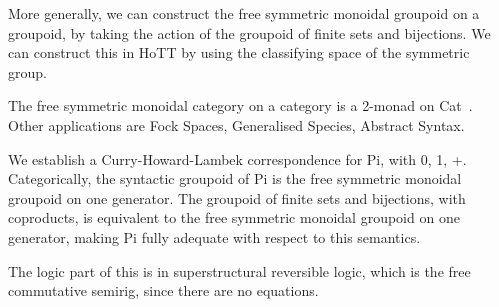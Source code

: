More generally, we can construct the free symmetric monoidal groupoid on a groupoid, by taking the action of the
groupoid of finite sets and bijections. We can construct this in HoTT by using the classifying space of the symmetric
group.

The free symmetric monoidal category on a category is a 2-monad on
Cat~\cite{blackwellTwodimensionalMonadTheory1989,abramskyAbstractScalarsLoops2005,leinsterHigherOperadsHigher2004}.
Other applications are Fock Spaces, Generalised Species, Abstract Syntax.

We establish a Curry-Howard-Lambek correspondence for Pi, with 0, 1, +. Categorically, the syntactic groupoid of Pi is
the free symmetric monoidal groupoid on one generator. The groupoid of finite sets and bijections, with coproducts, is
equivalent to the free symmetric monoidal groupoid on one generator, making Pi fully adequate with respect to this
semantics.

The logic part of this is in superstructural reversible logic, which is the free commutative semirig, since there are no
equations.

